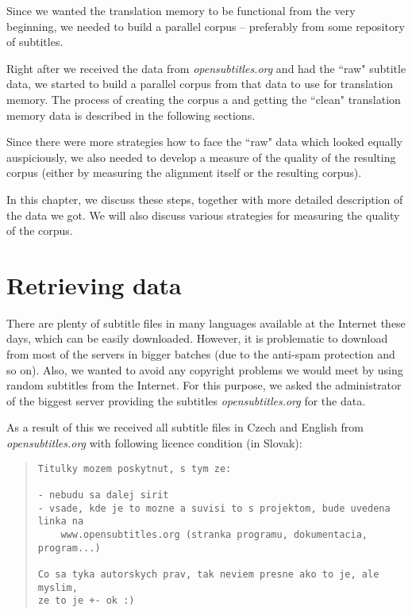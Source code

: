 \label{chap:building_corpus}

Since we wanted the translation memory to be functional from the very beginning, we needed to build a parallel corpus -- preferably from some repository of subtitles. 

Right after we received the data from \emph{opensubtitles.org} and had the ``raw" subtitle data, we started to build a parallel corpus from that data to use for translation memory. The process of creating the corpus a and getting the ``clean" translation memory data is described in the following sections.

Since there were more strategies how to face the ``raw" data which looked equally auspiciously, we also needed to develop a measure of the quality of the resulting corpus (either by measuring the alignment itself or the resulting corpus).

In this chapter, we discuss these steps, together with more detailed description of the data we got. We will also discuss various strategies for measuring the quality of the corpus.

\section{Retrieving data}

There are plenty of subtitle files in many languages available at the Internet these days, which can be easily downloaded. However, it is problematic to download from most of the servers in bigger batches (due to the anti-spam protection and so on). Also, we wanted to avoid any copyright problems we would meet by using random subtitles from the Internet. For this purpose, we asked the administrator of the biggest server providing the subtitles \emph{opensubtitles.org} for the data.

As a result of this we received all subtitle files in Czech and English from \emph{opensubtitles.org} with following licence condition (in Slovak):

\begin{quote}
\begin{verbatim}
Titulky mozem poskytnut, s tym ze:

- nebudu sa dalej sirit
- vsade, kde je to mozne a suvisi to s projektom, bude uvedena linka na
    www.opensubtitles.org (stranka programu, dokumentacia, program...)

Co sa tyka autorskych prav, tak neviem presne ako to je, ale myslim,
ze to je +- ok :)
\end{verbatim}
\end{quote}

